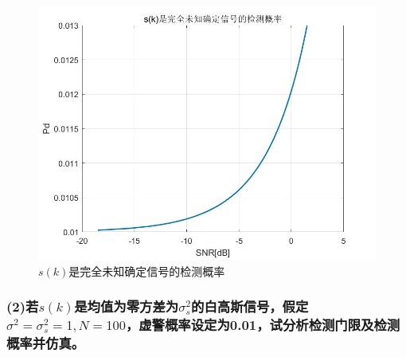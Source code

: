 \documentclass[fontset=windows]{article}
\numberwithin{figure}{section}
\begin{document}
\begin{figure}[H]
	\centering
	\includegraphics[scale=0.5]{fig4.2.jpg}
	\caption{\(s(k)\)是完全未知确定信号的检测概率}
	\label{6.4.2}
\end{figure}

\subsubsection*{(2)若\(s(k)\)是均值为零方差为\(\sigma^2_s\)的白高斯信号，假定\(\sigma^2=\sigma^2_s=1,N=100\)，虚警概率设定为0.01，试分析检测门限及检测概率并仿真。}
\end{document}
